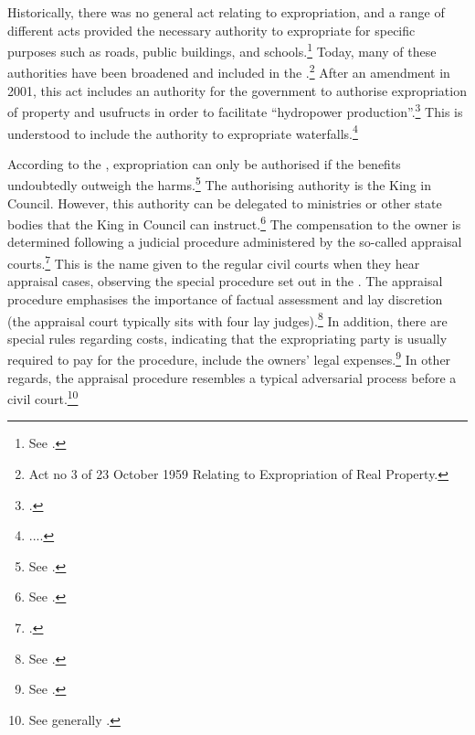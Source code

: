 Historically, there was no general act relating to expropriation, and a range of different acts provided the necessary authority to expropriate for specific purposes such as roads, public buildings, and schools.\footnote{See \cite[11-12]{nut54}.} Today, many of these authorities have been broadened and included in the \cite{ea59}.\footnote{Act no 3 of 23 October 1959 Relating to Expropriation of Real Property.} After an amendment in 2001, this act includes an authority for the government to authorise expropriation of property and usufructs in order to facilitate ``hydropower production''.\footcite[2 no 51]{ea59} This is understood to include the authority to expropriate waterfalls.\footnote{....}

According to the \cite{ea59}, expropriation can only be authorised if the benefits undoubtedly outweigh the harms.\footnote{See \cite[2]{ea59}.} 
The authorising authority is the King in Council. However, this authority can be delegated to ministries or other state bodies that the King in Council can instruct.\footnote{See \cite[5]{ea59}.} The compensation to the owner is determined following a judicial procedure administered by the so-called appraisal courts.\footnote{\cite[2]{ea59}.} This is the name given to the regular civil courts when they hear appraisal cases, observing the special procedure set out in the \cite{aa17}. The appraisal procedure emphasises the importance of factual assessment and lay discretion (the appraisal court typically sits with four lay judges).\footnote{See \cite[11-12]{aa17}.} In addition, there are special rules regarding costs, indicating that the expropriating party is usually required to pay for the procedure, include the owners' legal expenses.\footnote{See \cite[54]{aa17}.} In other regards, the appraisal procedure resembles a typical adversarial process before a civil court.\footnote{See generally \cite{dyrkolbotn15}.} 

